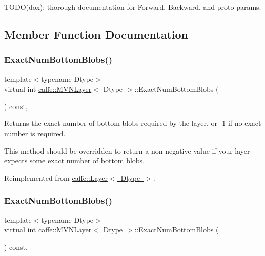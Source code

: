 T\+O\+D\+O(dox)\+: thorough documentation for Forward, Backward, and proto params. 

\subsection{Member Function Documentation}
\mbox{\label{classcaffe_1_1_m_v_n_layer_afd9b078a1bb48de9b91f3766edbbf058}} 
\subsubsection{\texorpdfstring{Exact\+Num\+Bottom\+Blobs()}{ExactNumBottomBlobs()}\hspace{0.1cm}{\footnotesize\ttfamily [1/2]}}
{\footnotesize\ttfamily template$<$typename Dtype$>$ \\
virtual int \mbox{\hyperlink{classcaffe_1_1_m_v_n_layer}{caffe\+::\+M\+V\+N\+Layer}}$<$ Dtype $>$\+::Exact\+Num\+Bottom\+Blobs (\begin{DoxyParamCaption}{ }\end{DoxyParamCaption}) const\hspace{0.3cm}{\ttfamily [inline]}, {\ttfamily [virtual]}}



Returns the exact number of bottom blobs required by the layer, or -\/1 if no exact number is required. 

This method should be overridden to return a non-\/negative value if your layer expects some exact number of bottom blobs. 

Reimplemented from \mbox{\hyperlink{classcaffe_1_1_layer_a8e5ee0494d85f5f55fc4396537cbc60f}{caffe\+::\+Layer$<$ Dtype $>$}}.

\mbox{\label{classcaffe_1_1_m_v_n_layer_afd9b078a1bb48de9b91f3766edbbf058}} 
\subsubsection{\texorpdfstring{Exact\+Num\+Bottom\+Blobs()}{ExactNumBottomBlobs()}\hspace{0.1cm}{\footnotesize\ttfamily [2/2]}}
{\footnotesize\ttfamily template$<$typename Dtype$>$ \\
virtual int \mbox{\hyperlink{classcaffe_1_1_m_v_n_layer}{caffe\+::\+M\+V\+N\+Layer}}$<$ Dtype $>$\+::Exact\+Num\+Bottom\+Blobs (\begin{DoxyParamCaption}{ }\end{DoxyParamCaption}) const\hspace{0.3cm}{\ttfamily [inline]}, {\ttfamily [virtual]}}



